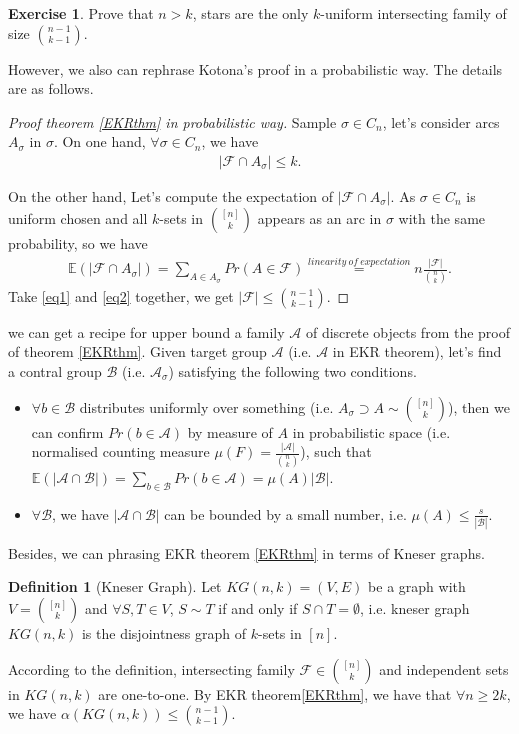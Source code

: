 \documentclass{article}
\theoremstyle{definition}
\newtheorem{definition}[theorem]{Definition}
\newtheorem{exercise}[theorem]{Exercise}
\begin{document}
\begin{exercise}
    Prove that $n>k$, stars are the only $k$-uniform intersecting family of size $\binom{n-1}{k-1}$.
\end{exercise}
However, we also can rephrase Kotona's proof in a probabilistic way. The details are as follows.

\begin{proof}[Proof theorem \ref{EKRthm} in probabilistic way]
Sample $\sigma\in C_n$, let's consider arcs $A_{\sigma}$ in $\sigma$.
On one hand, $\forall \sigma \in C_n$, we have 
\begin{align}\label{eq1}
   |\mathcal{F}\cap A_{\sigma}|\le k .
\end{align}

On the other hand, Let's compute the expectation of $|\mathcal{F}\cap A_{\sigma}|$. As $\sigma\in C_n$ is uniform chosen and all $k$-sets in $\binom{[n]}{k}$ appears as an arc in $\sigma$ with the same probability, so we have
\begin{align}\label{eq2}
\mathbb{E}(|\mathcal{F}\cap A_{\sigma}|)=\underset{A\in A_{\sigma}}{\sum}Pr(A\in \mathcal{F})\overset{linearity~of~expectation}{=}n\frac{|\mathcal{F}|}{\binom{n}{k}}.
\end{align}
Take \eqref{eq1} and \eqref{eq2} together, we get $|\mathcal{F}|\le\binom{n-1}{k-1}.$
\end{proof}

we can get a recipe for upper bound a family $\mathcal{A}$ of discrete objects from the proof of theorem \ref{EKRthm}.
Given target group $\mathcal{A}$ (i.e. $\mathcal{A}$ in EKR theorem), let's find a contral group $\mathcal{B}$ (i.e. $\mathcal{A_\sigma}$) satisfying the following two conditions.
\begin{itemize}
    \item $\forall b \in \mathcal{B}$ distributes uniformly over something (i.e. $A_\sigma \supset A \sim \binom{[n]}{k}$), then we can confirm $Pr(b\in \mathcal{A})$ by measure of $A$ in probabilistic space (i.e. normalised counting measure $\mu (F)=\frac{|\mathcal{A}|}{\binom{n}{k}}$), such that $\mathbb{E}(|\mathcal{A}\cap\mathcal{B}|)=\underset{b\in \mathcal{B}}{\sum}Pr(b\in\mathcal{A})=\mu(A)|\mathcal{B}|$.
    \item $\forall \mathcal{B}$, we have $|\mathcal{A}\cap\mathcal{B}|$ can be bounded by a small number, i.e. $\mu(A)\le \frac{s}{|\mathcal{B}|}$.
\end{itemize}

Besides, we can phrasing EKR theorem \ref{EKRthm} in terms of Kneser graphs. 
\begin{definition}[Kneser Graph]
    Let $KG(n,k)=(V,E)$ be a graph with $V=\binom{[n]}{k}$ and $\forall S,T\in V$, $S\sim T$ if and only if $S\cap T=\emptyset$, i.e. kneser graph $KG(n,k)$ is the disjointness graph of $k$-sets in $[n]$.
\end{definition}
According to the definition, intersecting family $\mathcal{F}\in \binom{[n]}{k}$ and independent sets in $KG(n,k)$ are one-to-one. By EKR theorem\ref{EKRthm}, we have that $\forall n\ge 2k$, we have $\alpha(KG(n,k))\le \binom{n-1}{k-1}$.
\end{document}
